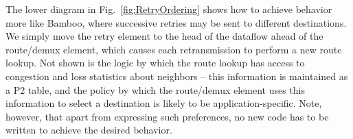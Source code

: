 The lower diagram in Fig.~\ref{fig:RetryOrdering} shows how to
achieve behavior more like Bamboo, where successive retries may be
sent to different destinations. We simply move the retry element to
the head of the dataflow ahead of the route/demux element, which causes
each retransmission to perform a new route lookup.  Not shown is the
logic by which the route lookup has access to congestion and loss
statistics about neighbors -- this information is maintained as a P2
table, and the policy by which the route/demux element uses this
information to select a destination is likely to be
application-specific.  Note, however, that apart from expressing such 
preferences, no new code has to be written to achieve the desired behavior. 



